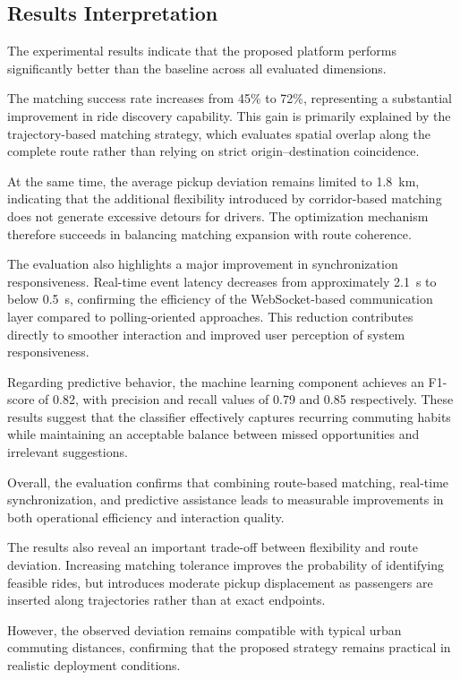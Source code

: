 \subsection{Results Interpretation}

The experimental results indicate that the proposed platform performs significantly better than the baseline across all evaluated dimensions.

The matching success rate increases from 45\% to 72\%, representing a substantial improvement in ride discovery capability. This gain is primarily explained by the trajectory-based matching strategy, which evaluates spatial overlap along the complete route rather than relying on strict origin--destination coincidence.

At the same time, the average pickup deviation remains limited to 1.8~km, indicating that the additional flexibility introduced by corridor-based matching does not generate excessive detours for drivers. The optimization mechanism therefore succeeds in balancing matching expansion with route coherence.

The evaluation also highlights a major improvement in synchronization responsiveness. Real-time event latency decreases from approximately 2.1~s to below 0.5~s, confirming the efficiency of the WebSocket-based communication layer compared to polling-oriented approaches. This reduction contributes directly to smoother interaction and improved user perception of system responsiveness.

Regarding predictive behavior, the machine learning component achieves an F1-score of 0.82, with precision and recall values of 0.79 and 0.85 respectively. These results suggest that the classifier effectively captures recurring commuting habits while maintaining an acceptable balance between missed opportunities and irrelevant suggestions.

Overall, the evaluation confirms that combining route-based matching, real-time synchronization, and predictive assistance leads to measurable improvements in both operational efficiency and interaction quality.

The results also reveal an important trade-off between flexibility and route deviation. Increasing matching tolerance improves the probability of identifying feasible rides, but introduces moderate pickup displacement as passengers are inserted along trajectories rather than at exact endpoints.

However, the observed deviation remains compatible with typical urban commuting distances, confirming that the proposed strategy remains practical in realistic deployment conditions.


